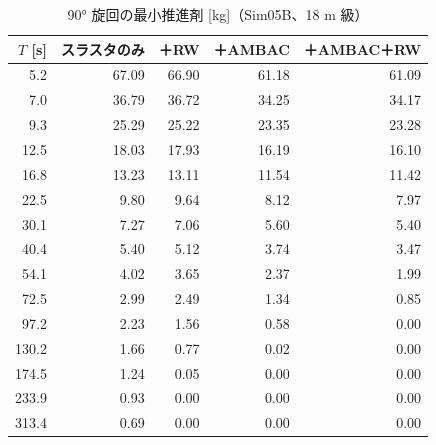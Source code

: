 \begin{longtable}{rrrrr}
\caption{90° 旋回の最小推進剤 [kg]（Sim05B、18 m 級）}\\
\toprule
$T$ [s] & スラスタのみ & ＋RW & ＋AMBAC & ＋AMBAC＋RW \\ \midrule \endhead
5.2 & 67.09 & 66.90 & 61.18 & 61.09 \\
7.0 & 36.79 & 36.72 & 34.25 & 34.17 \\
9.3 & 25.29 & 25.22 & 23.35 & 23.28 \\
12.5 & 18.03 & 17.93 & 16.19 & 16.10 \\
16.8 & 13.23 & 13.11 & 11.54 & 11.42 \\
22.5 & 9.80 & 9.64 & 8.12 & 7.97 \\
30.1 & 7.27 & 7.06 & 5.60 & 5.40 \\
40.4 & 5.40 & 5.12 & 3.74 & 3.47 \\
54.1 & 4.02 & 3.65 & 2.37 & 1.99 \\
72.5 & 2.99 & 2.49 & 1.34 & 0.85 \\
97.2 & 2.23 & 1.56 & 0.58 & 0.00 \\
130.2 & 1.66 & 0.77 & 0.02 & 0.00 \\
174.5 & 1.24 & 0.05 & 0.00 & 0.00 \\
233.9 & 0.93 & 0.00 & 0.00 & 0.00 \\
313.4 & 0.69 & 0.00 & 0.00 & 0.00 \\
\bottomrule
\end{longtable}
